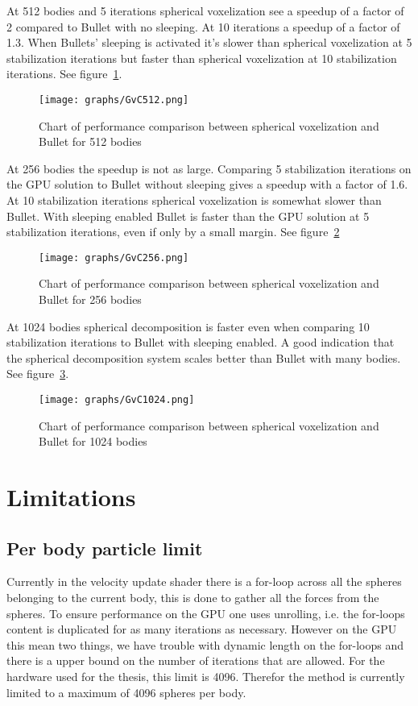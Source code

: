 At 512 bodies and 5 iterations spherical voxelization see a speedup of a factor of 2 compared to
Bullet with no sleeping. At 10 iterations a speedup of a factor of 1.3.
When Bullets' sleeping is activated it's slower than spherical voxelization at 5 stabilization iterations but faster than
spherical voxelization at 10 stabilization iterations. See figure~\ref{fig:GvC512}.

\begin{figure}[H]
  \centering
  \texttt{[image: graphs/GvC512.png]}
  \caption{Chart of performance comparison between spherical voxelization and Bullet for 512 bodies}
  \label{fig:GvC512}
\end{figure}

At 256 bodies the speedup is not as large. Comparing 5 stabilization iterations on the
GPU solution to Bullet without sleeping gives a speedup with a factor of 1.6.
At 10 stabilization iterations spherical voxelization is somewhat slower than Bullet.
With sleeping enabled Bullet is faster than the GPU solution at 5 stabilization iterations, even if
only by a small margin. See figure~\ref{fig:GvC256}

\begin{figure}[H]
  \centering
  \texttt{[image: graphs/GvC256.png]}
  \caption{Chart of performance comparison between spherical voxelization and Bullet for 256 bodies}
  \label{fig:GvC256}
\end{figure}

At 1024 bodies spherical decomposition is faster even when comparing 10 stabilization iterations
to Bullet with sleeping enabled. A good indication that the spherical decomposition system
scales better than Bullet with many bodies. See figure~\ref{fig:GvC1024}.

\begin{figure}[H]
  \centering
  \texttt{[image: graphs/GvC1024.png]}
  \caption{Chart of performance comparison between spherical voxelization and Bullet for 1024 bodies}
  \label{fig:GvC1024}
\end{figure}

\section{Limitations}
\subsection{Per body particle limit}
Currently in the velocity update shader there is a for-loop across all the spheres
belonging to the current body, this is done to gather all the forces from the spheres.
To ensure performance on the GPU one uses unrolling, i.e. the for-loops content is
duplicated for as many iterations as necessary. However on the GPU this mean two
things, we have trouble with dynamic length on the for-loops and there is a upper
bound on the number of iterations that are allowed. For the hardware used for the thesis,
this limit is 4096. Therefor the method is currently limited to a maximum of 4096
spheres per body.

